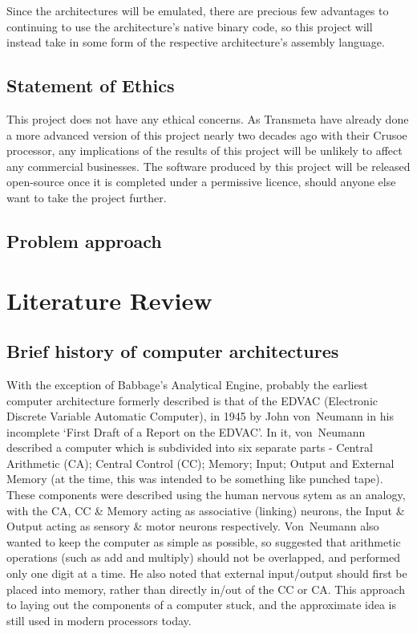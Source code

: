 \documentclass[11pt,a4paper,notitlepage]{report}
\begin{document}
Since the architectures will be emulated, there are precious few advantages to
continuing to use the architecture's native binary code, so this project will
instead take in some form of the respective architecture's assembly language.

\section{Statement of Ethics}
This project does not have any ethical concerns. As Transmeta have already done
a more advanced version of this project nearly two decades ago with their Crusoe
processor, any implications of the results of this project will be unlikely to
affect any commercial businesses. The software produced by this project will be
released open-source once it is completed under a permissive licence, should
anyone else want to take the project further.

\section{Problem approach}

\chapter{Literature Review}
\section{Brief history of computer architectures}
With the exception of Babbage's Analytical Engine, probably the earliest
computer architecture formerly described is that of the EDVAC (Electronic
Discrete Variable Automatic Computer), in 1945 by John von~Neumann in his
incomplete `First Draft of a Report on the EDVAC'. In it, von~Neumann described
a computer which is subdivided into six separate parts - Central Arithmetic
(CA); Central Control (CC); Memory; Input; Output and External Memory (at the
time, this was intended to be something like punched tape). These components
were described using the human nervous sytem as an analogy, with the CA, CC \&
Memory acting as associative (linking) neurons, the Input \& Output acting as
sensory \& motor neurons respectively.
Von~Neumann also wanted to keep the computer as simple as possible, so suggested
that arithmetic operations (such as add and multiply) should not be overlapped,
and performed only one digit at a time. He also noted that external input/output
should first be placed into memory, rather than directly in/out of the CC or CA.
This approach to laying out the components of a computer stuck, and the
approximate idea is still used in modern processors today.\cite{FirstDraft}
\end{document}
